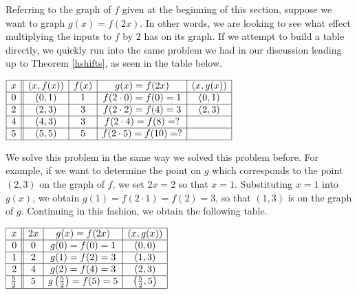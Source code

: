 Referring to the graph of $f$ given at the beginning of this section, suppose we want to graph $g(x) = f(2x)$.  In other words, we are looking to see what effect multiplying the inputs to $f$ by $2$ has on its graph.  If we attempt to build a table directly, we quickly run into the same problem we had in our discussion leading up to Theorem \ref{hshifts}, as seen in the table below.  
\begin{center}
$ \begin{array}{|c||c|c|c|c|}  

\hline

x & (x,f(x)) & f(x)& g(x)=f(2x) & (x, g(x)) \\ \hline
0  & (0,1)& 1 & f(2 \cdot 0) = f(0) = 1   &(0, 1) \\  \hline
2 & (2,3) & 3 & f(2\cdot2) = f(4) = 3  &(2,3) \\  \hline
4 & (4,3) & 3 &  f(2 \cdot 4) = f(8) = ? &  \\  \hline
5 & (5,5) & 5 & f(2 \cdot 5) = f(10) = ?  &  \\  \hline

\end{array} $ 
\end{center}

We solve this problem in the same way we solved this problem before.  For example, if we want to determine the point on $g$ which corresponds to the point $(2,3)$ on the graph of $f$,  we set $2x =2 $ so that $x=1$.  Substituting $x=1$ into $g(x)$, we obtain $g(1) = f(2 \cdot 1) = f(2) = 3$, so that $(1,3)$ is on the graph of $g$. Continuing in this fashion, we obtain the following table.   




\begin{center}
$ \begin{array}{|r||c|c|c|}  

\hline

x & 2x & g(x)=f(2x) & (x, g(x)) \\ \hline
0 & 0 & g(0)=f(0) = 1   &(0, 0) \\  \hline
1 &  2 &  g(1)=f(2) = 3  &(1,3) \\  \hline
2 & 4  & g(2)=f(4) = 3 &  (2,3)\\  \hline
\frac{5}{2}  & 5 & g\left(\frac{5}{2}\right)=f(5) = 5  & \left(\frac{5}{2},5\right) \\ [1pt] \hline

\end{array} $
\end{center}

